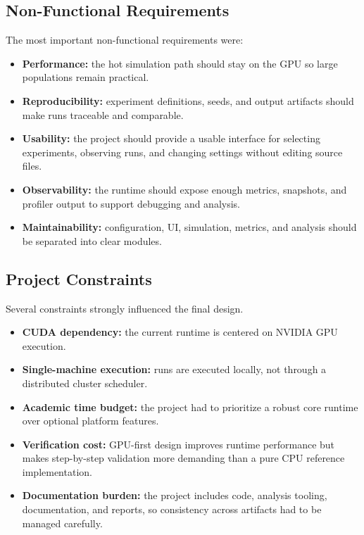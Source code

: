 \subsection{Non-Functional Requirements}

The most important non-functional requirements were:

\begin{itemize}[nosep]
  \item \textbf{Performance:} the hot simulation path should stay on the GPU so large
    populations remain practical.
  \item \textbf{Reproducibility:} experiment definitions, seeds, and output artifacts should make
    runs traceable and comparable.
  \item \textbf{Usability:} the project should provide a usable interface for selecting
    experiments, observing runs, and changing settings without editing source files.
  \item \textbf{Observability:} the runtime should expose enough metrics, snapshots, and
    profiler output to support debugging and analysis.
  \item \textbf{Maintainability:} configuration, UI, simulation, metrics, and analysis should be
    separated into clear modules.
\end{itemize}

\subsection{Project Constraints}

Several constraints strongly influenced the final design.

\begin{itemize}[nosep]
  \item \textbf{CUDA dependency:} the current runtime is centered on NVIDIA GPU execution.
  \item \textbf{Single-machine execution:} runs are executed locally, not through a distributed
    cluster scheduler.
  \item \textbf{Academic time budget:} the project had to prioritize a robust core runtime over
    optional platform features.
  \item \textbf{Verification cost:} GPU-first design improves runtime performance but makes
    step-by-step validation more demanding than a pure CPU reference implementation.
  \item \textbf{Documentation burden:} the project includes code, analysis tooling,
    documentation, and reports, so consistency across artifacts had to be managed carefully.
\end{itemize}

